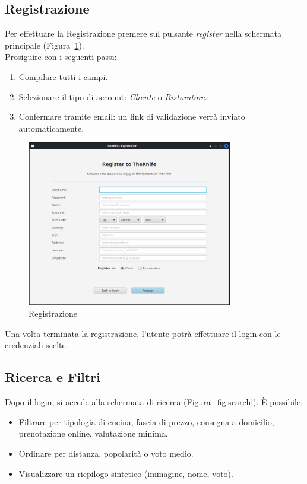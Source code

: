 \subsection{Registrazione}
Per effettuare la Registrazione premere sul pulsante \emph{register} nella schermata principale (Figura~\ref{fig:registration}).\\
Prosiguire con i seguenti passi:
\begin{enumerate}
    \item Compilare tutti i campi.
    \item Selezionare il tipo di account: \emph{Cliente} o \emph{Ristoratore}.
    \item Confermare tramite email: un link di validazione verrà inviato automaticamente.
\end{enumerate}
\begin{figure}[H]
    \centering
    \includegraphics[width=0.8\textwidth]{images/registration.png}
    \caption{Registrazione}
    \label{fig:registration}
\end{figure}
Una volta terminata la registrazione, l'utente potrà effettuare il login con le credenziali scelte.

\subsection{Ricerca e Filtri}
Dopo il login, si accede alla schermata di ricerca (Figura~\ref{fig:search}). È possibile:
\begin{itemize}
    \item Filtrare per tipologia di cucina, fascia di prezzo, consegna a domicilio, prenotazione online, valutazione minima.
    \item Ordinare per distanza, popolarità o voto medio.
    \item Visualizzare un riepilogo sintetico (immagine, nome, voto).
\end{itemize}

